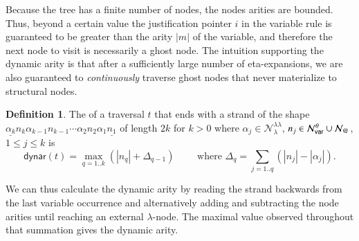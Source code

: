 \documentclass{elsarticle}
\makeatletter
\newif\iflongversion
\theoremstyle{plain}
\theoremstyle{definition}
\newtheorem{definition}{Definition}[section]
\newcommand\Nodes{\mathcal{N}}%
\newcommand\NodesVar{\Nodes_{\sf var}}%
\newcommand\NodesLmd{\Nodes_\lambda}%
\newcommand\NodesApp{\Nodes_@}%
\newcommand{\ghostlmd}{{\lambda\!\!\lambda}}
\newcommand{\ghostvar}{\theta}
\newcommand\ExtendedNodesVar{\NodesVar^\ghostvar}
\newcommand\ExtendedNodesLmd{\NodesLmd^\ghostlmd}
\newcommand\dynar{\textsf{dynar}} %
\makeatother
\begin{document}
Because the tree has a finite number of nodes, the nodes arities are bounded. Thus, beyond a certain value the
justification pointer $i$ in the variable rule
  is guaranteed to be greater than the arity $|m|$ of the variable, and therefore the next node to visit is necessarily a ghost node. The intuition supporting the dynamic arity is that after a sufficiently large number of eta-expansions, we are also guaranteed to \emph{continuously} traverse ghost nodes that never materialize to structural nodes.
\iflongversion
 In other words, any further extension will necessarily be constructed using repeated applications of \rulenamet{Lam^\ghostvar} and the eta-expanded variants of \rulenamet{Var}, and will thus consists only of ghost occurrences.
\fi

\begin{definition} %
\label{dfn:dynamic-arity}
The  of a traversal $t$ that ends with a strand
 of the shape $\underline{\alpha_k} n_k \alpha_{k-1} n_{k-1}\cdots \alpha_2 n_2 \alpha_1 \underline{n_1}$ of length $2k$ for $k>0$ where $\alpha_j \in \ExtendedNodesLmd$, $n_j \in \ExtendedNodesVar\union\NodesApp$, $1\leq j\leq k$ is
$$
\dynar(t)
  = \max_{q=1..k} \left( |n_q| + \Delta_{q-1} \right)
  \qquad
  \mbox{ where }
  \Delta_q = \sum_{j=1..q} (|n_j|-|\alpha_j|).
$$
\end{definition}

\iflongversion
We also have
$\dynar(t) = \max_{q=1..k} \left( |\alpha_q| + \Delta_{q} \right)$.
Equivalently, it is given by the maximal value in the sequence $b_1 = |n_1|$, $b_{q+1} = b_q + |n_{q+1}|-|\alpha_q|$ for $1 \leq q \leq k-1$.
\fi
We can thus calculate the dynamic arity by reading the strand backwards from the last variable occurrence and alternatively adding and subtracting the node arities until reaching an external $\lambda$-node. The maximal value observed throughout that summation gives the dynamic arity.
\end{document}
